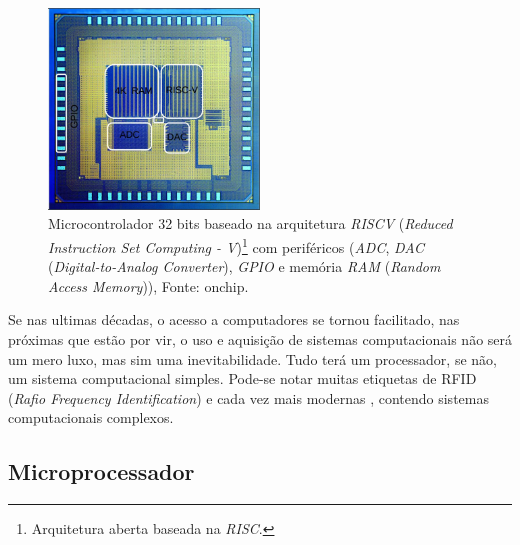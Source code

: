 

\begin{figure}[!htb]
  \centering
  \includegraphics[width=0.5\textwidth]{figuras/riscv.jpg}
    \caption[Microcontrolador na pastilha de silício.]{Microcontrolador 32 bits baseado na arquitetura \textit{RISCV} (\textit{Reduced Instruction Set Computing - V})\footnote{Arquitetura aberta baseada na \textit{RISC}.}
  com periféricos (\textit{ADC}, \textit{DAC} (\textit{Digital-to-Analog Converter}), \textit{GPIO} e memória \textit{RAM} (\textit{Random Access Memory})), Fonte: onchip\cite{onchip}.}
  \label{fig:ricv}
\end{figure}


Se nas ultimas décadas, o acesso a computadores se tornou facilitado, nas próximas que estão por vir, o uso e aquisição de sistemas computacionais não será um mero luxo, mas sim uma inevitabilidade\cite{gates1995estrada}. Tudo terá um processador, se não, um sistema computacional simples. Pode-se notar muitas etiquetas de RFID (\textit{Rafio Frequency Identification}) e cada vez mais modernas \cite{ricci2008design}, contendo sistemas computacionais complexos.


\subsection{Microprocessador}

